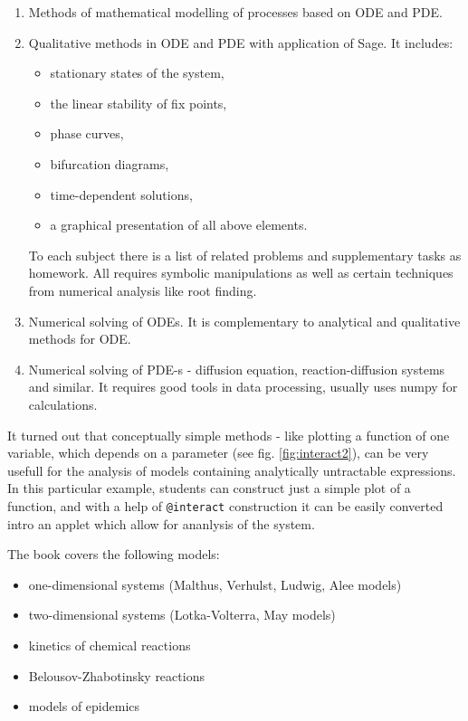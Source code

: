 \documentclass{deliverablereport}
\begin{document}
\begin{enumerate}
\item Methods of mathematical modelling of  processes based on ODE and PDE. 
\item Qualitative methods in ODE and PDE with application of Sage. It
  includes:
  \begin{itemize}
  \item stationary states of the system,
  \item the linear stability of fix points,
  \item phase curves,
  \item bifurcation diagrams,
  \item time-dependent solutions,
  \item a graphical  presentation of all above  elements. 
  \end{itemize}
  
  To each subject there is a list of related problems and
  supplementary tasks as homework. All requires symbolic manipulations
  as well as certain techniques from numerical analysis like root
  finding.
  
\item Numerical solving of ODEs. It is complementary to analytical and
  qualitative methods for ODE. 
\item Numerical solving of PDE-s - diffusion equation,
  reaction-diffusion systems and similar. It requires good tools in data
  processing, usually uses numpy for calculations.

\end{enumerate}


It turned out that conceptually simple methods - like plotting a
function of one variable, which depends on a parameter (see
fig. \ref{fig:interact2}), can be very usefull for the analysis of
models containing analytically untractable expressions. In this
particular example, students can construct just a simple plot of a
function, and with a help of \texttt{@interact} construction it can be
easily converted intro an applet which allow for ananlysis of the
system. 

The book covers the following  models: 
 \begin{itemize}
  \item one-dimensional systems (Malthus, Verhulst, Ludwig, Alee models) 
  \item two-dimensional systems (Lotka-Volterra, May models) 
  \item kinetics of chemical reactions
  \item Belousov-Zhabotinsky reactions
  \item models of epidemics
 \end{itemize}
\end{document}

